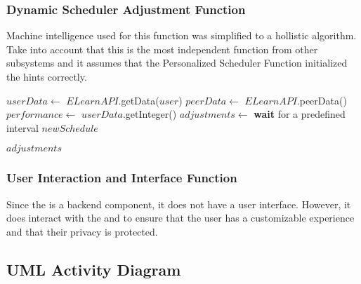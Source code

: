 \documentclass[12pt]{article}
\begin{document}
\subsubsection{Dynamic Scheduler Adjustment Function}
Machine intelligence used for this function was simplified to a hollistic algorithm. Take into account that this is the most independent function from other subsystems and it assumes that the Personalized Scheduler Function initialized the hints correctly.
\begin{algorithmic}[1] %
    \State $userData \gets$ $ELearnAPI$.getData($user$)
    \State $peerData \gets$ $ELearnAPI$.peerData()
        \State $performance \gets$ $userData$.getInteger()
        \State $adjustments \gets$ 
        \State {}
        \State {}
        \State \textbf{wait} for a predefined interval
    \EndWhile
    \State \Return $newSchedule$
\EndFunction
\Statex

    \State {}
    \State {}
    \State \Return $adjustments$
\EndFunction
\Statex

    \State {}
\EndFunction
\Statex

    \State {}
\EndFunction

\end{algorithmic}

\subsubsection{User Interaction and Interface Function}
Since the \subsystem is a backend component, it does not have a user interface. However, it does interact with the \userSubsystem and \securitySubsystem to ensure that the user has a customizable experience and that their privacy is protected.

\newpage
\subsection{UML Activity Diagram}
\end{document}
